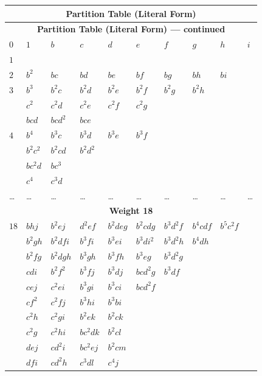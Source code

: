 \documentclass[11pt,a4paper]{article}
\theoremstyle{definition}
\begin{document}
\begin{center}
\small
\begin{longtable}{|l|l|l|l|l|l|l|l|l|l|}
\hline
\multicolumn{10}{|c|}{\textbf{Partition Table (Literal Form)}} \\
\hline
\endfirsthead
\hline
\multicolumn{10}{|c|}{\textbf{Partition Table (Literal Form) --- continued}} \\
\hline
\endhead
\hline
\endfoot
$0$ & $1$ & $b$ & $c$ & $d$ & $e$ & $f$ & $g$ & $h$ & $i$ \\
\hline
$1$ & & & & & & & & & \\
\hline
$2$ & $b^2$ & $bc$ & $bd$ & $be$ & $bf$ & $bg$ & $bh$ & $bi$ & \\
\hline
$3$ & $b^3$ & $b^2c$ & $b^2d$ & $b^2e$ & $b^2f$ & $b^2g$ & $b^2h$ & & \\
  & $c^2$ & $c^2d$ & $c^2e$ & $c^2f$ & $c^2g$ & & & & \\
  & $bcd$ & $bcd^2$ & $bce$ & & & & & & \\
\hline
$4$ & $b^4$ & $b^3c$ & $b^3d$ & $b^3e$ & $b^3f$ & & & & \\
  & $b^2c^2$ & $b^2cd$ & $b^2d^2$ & & & & & & \\
  & $bc^2d$ & $bc^3$ & & & & & & & \\
  & $c^4$ & $c^3d$ & & & & & & & \\
\hline
\dots & \dots & \dots & \dots & \dots & \dots & \dots & \dots & \dots & \dots \\
\hline
\multicolumn{10}{|c|}{\textbf{Weight 18}} \\
\hline
$18$ & $bhj$ & $b^2ej$ & $d^2ef$ & $b^2deg$ & $b^2cdg$ & $b^3d^2f$ & $b^4cdf$ & $b^5c^2f$ & \\
   & $b^2gh$ & $b^2dfi$ & $b^3fi$ & $b^3ei$ & $b^3di^2$ & $b^3d^2h$ & $b^4dh$ & & \\
   & $b^2fg$ & $b^2dgh$ & $b^3gh$ & $b^3fh$ & $b^3eg$ & $b^3d^2g$ & & & \\
   & $cdi$ & $b^2f^2$ & $b^3fj$ & $b^3dj$ & $bcd^2g$ & $b^3df$ & & & \\
   & $cej$ & $c^2ei$ & $b^3gi$ & $b^3ci$ & $bcd^2f$ & & & & \\
   & $cf^2$ & $c^2fj$ & $b^3hi$ & $b^3bi$ & & & & & \\
   & $c^2h$ & $c^2gi$ & $b^2ek$ & $b^2ck$ & & & & & \\
   & $c^2g$ & $c^2hi$ & $bc^2dk$ & $b^2cl$ & & & & & \\
   & $dej$ & $cd^2i$ & $bc^2ej$ & $b^2cm$ & & & & & \\
   & $dfi$ & $cd^2h$ & $c^3dl$ & $c^4j$ & & & & & \\
\hline
\end{longtable}
\end{center}
\end{document}
